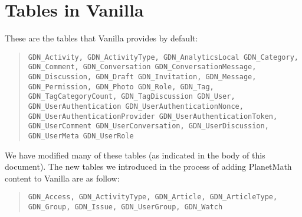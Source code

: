 \documentclass{article}
\begin{document}
\section{Tables in Vanilla}

These are the tables that Vanilla provides by default:

\begin{quotation}
\begin{minipage}{4in}
{\tt GDN\_Activity, GDN\_ActivityType, GDN\_AnalyticsLocal
  GDN\_Category, GDN\_Comment, GDN\_Conversation
  GDN\_ConversationMessage, GDN\_Discussion, GDN\_Draft
  GDN\_Invitation, GDN\_Message, GDN\_Permission,
  GDN\_Photo GDN\_Role, GDN\_Tag, GDN\_TagCategoryCount,
  GDN\_TagDiscussion GDN\_User, GDN\_UserAuthentication
  GDN\_UserAuthenticationNonce,
  GDN\_UserAuthenticationProvider
  GDN\_UserAuthenticationToken, GDN\_UserComment
  GDN\_UserConversation, GDN\_UserDiscussion,
  GDN\_UserMeta GDN\_UserRole }
\end{minipage}
\end{quotation}

We have modified many of these tables (as indicated in the
body of this document).  The new tables we introduced in
the process of adding PlanetMath content to Vanilla are as
follow:

\begin{quotation}
\begin{minipage}{4in}
{\tt GDN\_Access, GDN\_ActivityType, GDN\_Article, GDN\_ArticleType, GDN\_Group, GDN\_Issue, GDN\_UserGroup, GDN\_Watch }
\end{minipage}
\end{quotation}


{}

\end{document}
